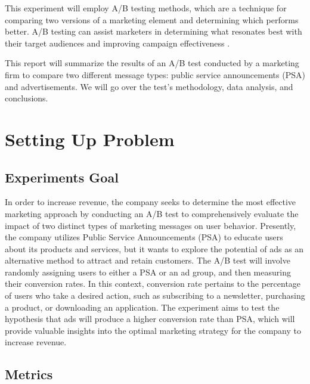 \documentclass{article}
\begin{document}
This experiment will employ A/B testing methods, which are a technique for comparing two versions of a marketing element and determining which performs better. A/B testing can assist marketers in determining what resonates best with their target audiences and improving campaign effectiveness \cite{baldwin_2023_how}. \par

This report will summarize the results of an A/B test conducted by a marketing firm to compare two different message types: public service announcements (PSA) and advertisements. We will go over the test's methodology, data analysis, and conclusions. \par

\section{Setting Up Problem} \par

\subsection*{Experiments Goal} \par

In order to increase revenue, the company seeks to determine the most effective marketing approach by conducting an A/B test to comprehensively evaluate the impact of two distinct types of marketing messages on user behavior. Presently, the company utilizes Public Service Announcements (PSA) to educate users about its products and services, but it wants to explore the potential of ads as an alternative method to attract and retain customers. The A/B test will involve randomly assigning users to either a PSA or an ad group, and then measuring their conversion rates. In this context, conversion rate pertains to the percentage of users who take a desired action, such as subscribing to a newsletter, purchasing a product, or downloading an application. The experiment aims to test the hypothesis that ads will produce a higher conversion rate than PSA, which will provide valuable insights into the optimal marketing strategy for the company to increase revenue. \par

\subsection*{Metrics} \par
\end{document}
